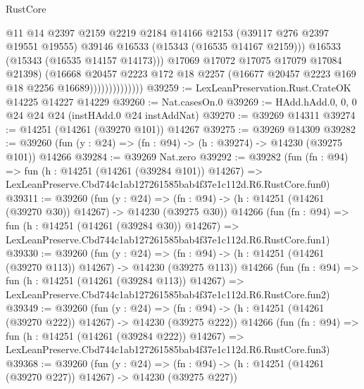 \begin{lexlean}{RustCore}
\begin{coremodule}
                                  @11
                                  @14
                                  @2397
                                  @2159
                                  @2219
                                  @2184
                                  @14166
                                  @2153
                                  (@39117 @276 @2397 @19551 @19555)
                                  @39146
                                  @16533
                                  (@15343 (@16535 @14167 @2159)))
                                @16533
                                (@15343 (@16535 @14157 @14173)))
                              @17069
                              @17072
                              @17075
                              @17079
                              @17084
                              @21398)
                            (@16668
                              @20457
                              @2223
                              @172
                              @18
                              @2257
                              (@16677 @20457 @2223 @169 @18 @2256 @16689))))))))))))))
@39259 := LexLeanPreservation.Rust.CrateOK @14225 @14227 @14229
@39260 := Nat.casesOn.{0}
@39269 := HAdd.hAdd.{0, 0, 0} @24 @24 @24 (instHAdd.{0} @24 instAddNat)
@39270 := @39269 @14311
@39274 := @14251 (@14261 (@39270 @101)) @14267
@39275 := @39269 @14309
@39282 := @39260 (fun (y : @24) => (fn : @94) -> (h : @39274) -> @14230 (@39275 @101)) @14266
@39284 := @39269 Nat.zero
@39292 := @39282
    (fun (fn : @94) =>
    fun (h : @14251 (@14261 (@39284 @101)) @14267) =>
    LexLeanPreserve.Cbd744c1ab127261585bab4f37e1c112d.R6.RustCore.fun0)
@39311 := @39260
    (fun (y : @24) =>
    (fn : @94) -> (h : @14251 (@14261 (@39270 @30)) @14267) -> @14230 (@39275 @30))
    @14266
    (fun (fn : @94) =>
    fun (h : @14251 (@14261 (@39284 @30)) @14267) =>
    LexLeanPreserve.Cbd744c1ab127261585bab4f37e1c112d.R6.RustCore.fun1)
@39330 := @39260
    (fun (y : @24) =>
    (fn : @94) -> (h : @14251 (@14261 (@39270 @113)) @14267) -> @14230 (@39275 @113))
    @14266
    (fun (fn : @94) =>
    fun (h : @14251 (@14261 (@39284 @113)) @14267) =>
    LexLeanPreserve.Cbd744c1ab127261585bab4f37e1c112d.R6.RustCore.fun2)
@39349 := @39260
    (fun (y : @24) =>
    (fn : @94) -> (h : @14251 (@14261 (@39270 @222)) @14267) -> @14230 (@39275 @222))
    @14266
    (fun (fn : @94) =>
    fun (h : @14251 (@14261 (@39284 @222)) @14267) =>
    LexLeanPreserve.Cbd744c1ab127261585bab4f37e1c112d.R6.RustCore.fun3)
@39368 := @39260
    (fun (y : @24) =>
    (fn : @94) -> (h : @14251 (@14261 (@39270 @227)) @14267) -> @14230 (@39275 @227))

\end{coremodule}
\end{lexlean}
